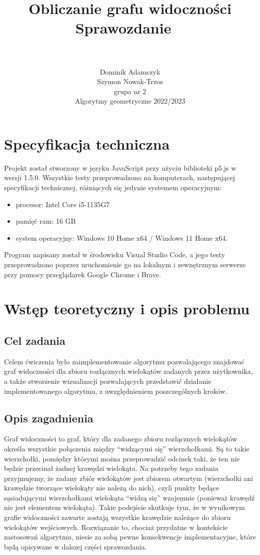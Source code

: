 \documentclass{article}
\title{\Huge Obliczanie grafu widoczności \\
\Huge Sprawozdanie \ \\ \ \\}
\author{\Large Dominik Adamczyk \\ \Large Szymon Nowak-Trzos \\ grupa nr 2 \\ Algorytmy geometryczne 2022/2023}
\date{}
\begin{document}
\maketitle

\newpage
\tableofcontents
\newpage

\section{Specyfikacja techniczna}
\qquad Projekt został stworzony w języku JavaScript przy użyciu biblioteki p5.js w wersji 1.5.0. Wszystkie testy przeprowadzono na komputerach, następującej specyfikacji technicznej, różniących się jedynie systemem operacyjnym:
\begin{itemize}
\item procesor: Intel Core i5-1135G7
\item pamięć ram: 16 GB
\item system operacyjny: Windows 10 Home x64 / Windows 11 Home x64.
\end{itemize}
\noindent \qquad Program napisany został w środowisku Visual Studio Code, a jego testy przeprowadzono poprzez uruchomienie go na lokalnym i zewnętrznym serwerze przy pomocy przeglądarek Google Chrome i Brave.


\section{Wstęp teoretyczny i opis problemu}
\subsection{Cel zadania}
\qquad Celem ćwiczenia było zaimplementowanie algorytmu pozwalającego znajdować graf widoczności dla zbioru rozłącznych wielokątów zadanych przez użytkownika, a także stworzenie wizualizacji pozwalających przedstawić działanie implementowanego algorytmu, z uwzględnieniem poszczególnych kroków.
\subsection{Opis zagadnienia}

\qquad Graf widoczności to graf, który dla zadanego zbioru rozłącznych wielokątów określa wszystkie połączenia między ``widzącymi się'' wierzchołkami. Są to takie wierzchołki, pomiędzy którymi można przeprowadzić odcinek taki, że ten nie będzie przecinał żadnej krawędzi wielokąta. Na potrzeby tego zadania przyjmujemy, że zadany zbiór wielokątów jest zbiorem otwartym (wierzchołki ani krawędzie tworzące wielokąty nie należą do nich), czyli punkty będące sąsiadującymi wierzchołkami wielokąta ``widzą się'' wzajemnie (ponieważ krawędź nie jest elementem wielokąta). Takie podejście skutkuje tym, że w wynikowym grafie widoczności zawarte zostają wszystkie krawędzie należące do zbioru wielokątów wejściowych. Rozwiązanie to, chociaż przydatne w kontekście zastosowań algorytmu, niesie za sobą pewne konsekwencje implementacyjne, które będą opisywane w dalszej części sprawozdania.
\end{document}
